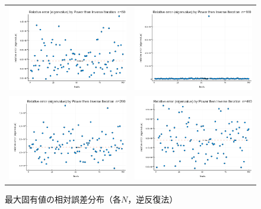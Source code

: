 \documentclass[a4paper,11pt]{ltjsarticle}
\begin{document}
\begin{figure}[H]
  \centering
  \begin{tabular}{cc}
    \includegraphics[width=72mm]{graphs/exp4_n50_relerr_eigenvalue.png} &
    \includegraphics[width=72mm]{graphs/exp4_n100_relerr_eigenvalue.png} \\
    \includegraphics[width=72mm]{graphs/exp4_n200_relerr_eigenvalue.png} &
    \includegraphics[width=72mm]{graphs/exp4_n400_relerr_eigenvalue.png} \\
  \end{tabular}
  \caption{最大固有値の相対誤差分布（各$N$，逆反復法）}
  \label{fig:exp4_relerr_lambda}
\end{figure}
\end{document}
